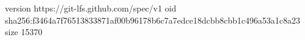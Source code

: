 version https://git-lfs.github.com/spec/v1
oid sha256:f3464a7f76513833871af00b96178b6c7a7edce18dcbb8cbb1c496a53a1c8a23
size 15370
